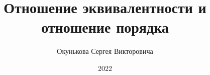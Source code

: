 \documentclass[spec, och, labwork]{shiza}
\begin{document}
\chair{}

\title{Отношение эквивалентности и отношение порядка}






\author{Окунькова Сергея Викторовича}








\date{2022}

\maketitle

\end{document}
